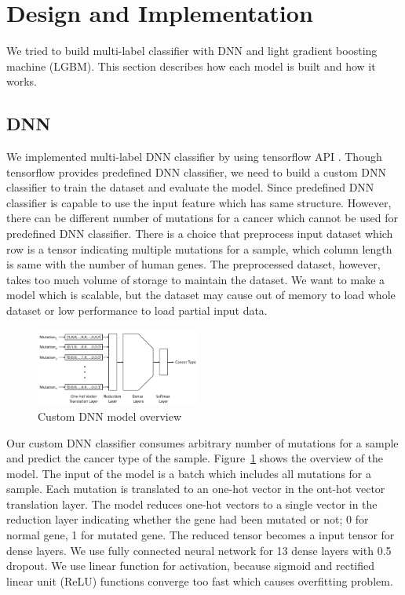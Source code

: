 \section{Design and Implementation}

We tried to build multi-label classifier with DNN and light gradient boosting machine (LGBM). This section describes how each model is built and how it works.

\subsection{DNN}

We implemented multi-label DNN classifier by using  tensorflow API \cite{tensorflow_api}. Though tensorflow provides predefined DNN classifier, we need to build a custom DNN classifier to train the dataset and evaluate the model. Since predefined DNN classifier is capable to use the input feature which has same structure. However, there can be different number of mutations for a cancer which cannot be used for predefined DNN classifier. There is a choice that preprocess input dataset which row is a tensor indicating multiple mutations for a sample, which column length is same with the number of human genes. The preprocessed dataset, however, takes too much volume of storage to maintain the dataset. We want to make a model which is scalable, but the dataset may cause out of memory to load whole dataset or low performance to load partial input data.

\begin{figure}[t]
\includegraphics[width=0.48\textwidth]{figs/overview_dnn_model.png}
\caption{Custom DNN model overview}
\label{fig:overview_dnn_model}
\end{figure}

Our custom DNN classifier consumes arbitrary number of mutations for a sample and predict the cancer type of the sample. Figure~\ref{fig:overview_dnn_model} shows the overview of the model. The input of the model is a batch which includes all mutations for a sample. Each mutation is translated to an one-hot vector in the ont-hot vector translation layer. The model reduces one-hot vectors to a single vector in the reduction layer indicating whether the gene had been mutated or not; 0 for normal gene, 1 for mutated gene. The reduced tensor becomes a input tensor for dense layers. We use fully connected neural network for 13 dense layers with 0.5 dropout. We use linear function for activation, because sigmoid and rectified linear unit (ReLU) functions  converge too fast which causes overfitting problem.

